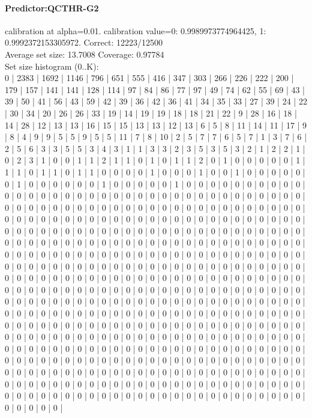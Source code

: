 \documentclass[parskip=half]{scrartcl}
\begin{document}
\paragraph{Predictor:QCTHR-G2} calibration at alpha=0.01. calibration value={0: 0.9989973774964425, 1: 0.9992372153305972}. Correct: 12223/12500\\
Average set size: 13.7008   Coverage: 0.97784\\
Set size histogram (0..K):\\
0 | 2383 | 1692 | 1146 | 796 | 651 | 555 | 416 | 347 | 303 | 266 | 226 | 222 | 200 | 179 | 157 | 141 | 141 | 128 | 114 | 97 | 84 | 86 | 77 | 97 | 49 | 74 | 62 | 55 | 69 | 43 | 39 | 50 | 41 | 56 | 43 | 59 | 42 | 39 | 36 | 42 | 36 | 41 | 34 | 35 | 33 | 27 | 39 | 24 | 22 | 30 | 34 | 20 | 26 | 26 | 33 | 19 | 14 | 19 | 19 | 18 | 18 | 21 | 22 | 9 | 28 | 16 | 18 | 14 | 28 | 12 | 13 | 13 | 16 | 15 | 15 | 13 | 13 | 12 | 13 | 6 | 5 | 8 | 11 | 14 | 11 | 17 | 9 | 8 | 4 | 9 | 9 | 5 | 5 | 9 | 5 | 5 | 11 | 7 | 8 | 10 | 2 | 5 | 7 | 7 | 6 | 5 | 7 | 1 | 3 | 7 | 6 | 2 | 5 | 6 | 3 | 3 | 5 | 5 | 3 | 4 | 3 | 1 | 1 | 3 | 3 | 2 | 3 | 5 | 3 | 5 | 3 | 2 | 1 | 2 | 2 | 1 | 0 | 2 | 3 | 1 | 0 | 0 | 1 | 1 | 2 | 1 | 1 | 0 | 1 | 0 | 1 | 1 | 2 | 0 | 1 | 0 | 0 | 0 | 0 | 0 | 1 | 1 | 1 | 0 | 1 | 1 | 0 | 1 | 1 | 0 | 0 | 0 | 0 | 1 | 0 | 0 | 0 | 1 | 0 | 0 | 1 | 0 | 0 | 0 | 0 | 0 | 0 | 1 | 0 | 0 | 0 | 0 | 0 | 0 | 1 | 0 | 0 | 0 | 0 | 0 | 1 | 0 | 0 | 0 | 0 | 0 | 0 | 0 | 0 | 0 | 0 | 0 | 0 | 0 | 0 | 0 | 0 | 0 | 0 | 0 | 0 | 0 | 0 | 0 | 0 | 0 | 0 | 0 | 0 | 0 | 0 | 0 | 0 | 0 | 0 | 0 | 0 | 0 | 0 | 0 | 0 | 0 | 0 | 0 | 0 | 0 | 0 | 0 | 0 | 0 | 0 | 0 | 0 | 0 | 0 | 0 | 0 | 0 | 0 | 0 | 0 | 0 | 0 | 0 | 0 | 0 | 0 | 0 | 0 | 0 | 0 | 0 | 0 | 0 | 0 | 0 | 0 | 0 | 0 | 0 | 0 | 0 | 0 | 0 | 0 | 0 | 0 | 0 | 0 | 0 | 0 | 0 | 0 | 0 | 0 | 0 | 0 | 0 | 0 | 0 | 0 | 0 | 0 | 0 | 0 | 0 | 0 | 0 | 0 | 0 | 0 | 0 | 0 | 0 | 0 | 0 | 0 | 0 | 0 | 0 | 0 | 0 | 0 | 0 | 0 | 0 | 0 | 0 | 0 | 0 | 0 | 0 | 0 | 0 | 0 | 0 | 0 | 0 | 0 | 0 | 0 | 0 | 0 | 0 | 0 | 0 | 0 | 0 | 0 | 0 | 0 | 0 | 0 | 0 | 0 | 0 | 0 | 0 | 0 | 0 | 0 | 0 | 0 | 0 | 0 | 0 | 0 | 0 | 0 | 0 | 0 | 0 | 0 | 0 | 0 | 0 | 0 | 0 | 0 | 0 | 0 | 0 | 0 | 0 | 0 | 0 | 0 | 0 | 0 | 0 | 0 | 0 | 0 | 0 | 0 | 0 | 0 | 0 | 0 | 0 | 0 | 0 | 0 | 0 | 0 | 0 | 0 | 0 | 0 | 0 | 0 | 0 | 0 | 0 | 0 | 0 | 0 | 0 | 0 | 0 | 0 | 0 | 0 | 0 | 0 | 0 | 0 | 0 | 0 | 0 | 0 | 0 | 0 | 0 | 0 | 0 | 0 | 0 | 0 | 0 | 0 | 0 | 0 | 0 | 0 | 0 | 0 | 0 | 0 | 0 | 0 | 0 | 0 | 0 | 0 | 0 | 0 | 0 | 0 | 0 | 0 | 0 | 0 | 0 | 0 | 0 | 0 | 0 | 0 | 0 | 0 | 0 | 0 | 0 | 0 | 0 | 0 | 0 | 0 | 0 | 0 | 0 | 0 | 0 | 0 | 0 | 0 | 0 | 0 | 0 | 0 | 0 | 0 | 0 | 0 | 0 | 0 | 0 | 0 | 0 | 0 | 0 | 0 | 0 | 0 | 0 | 0 | 0 | 0 | 0 | 0 | 0 | 0 | 0 | 0 | 0 | 0 | 0 | 0 | 0 | 0 | 0 | 0 | 0 | 0 | 0 | 0 | 0 | 0 | 0 | 0 | 0 | 0 | 0 | 0 | 0 | 0 | 0 | 0 | 0 | 0 | 0 | 0 | 0 | 0 | 0 | 0 | 0 | 0 | 0 | 0 | 0 | 0 | 0 | 0 | 0 | 0 | 0 | 0 | 0 | 0 | 0 | 0 | 0 | 0 | 0 | 0 | 0 | 0 | 0 | 0 | 0 | 0 | 0 | 0 | 0 | 0 | 0 | 0 | 0 | 0 | 0 | 0 | 0 | 0 | 0 | 0 | 0 | 0 | 0 | 0 | 0 | 0 | 0 | 0 | 0 | 0 | 0 | 0 | 0 | 0 | 0 | 0 | 0 | 0 | 0 | 0 | 0 | 0 | 0 | 0 | 0 | 0 | 0 | 0 | 0 | 0 | 0 | 0 | 0 | 0 | 0 | 0 | 0 | 0 | 0 | 0 | 0 | 0 | 0 | 0 | 0 | 0 | 0 | 0 | 0 | 0 | 0 | 0 | 0 | 0 | 0 | 0 | 0 | 0 | 0 | 0 | 0 | 0 | 0 | 0 | 0 | 0 | 0 | 0 | 0 | 0 | 0 | 0 | 0 | 0 | 0 | 0 | 0 | 0 | 0 | 
\end{document}
